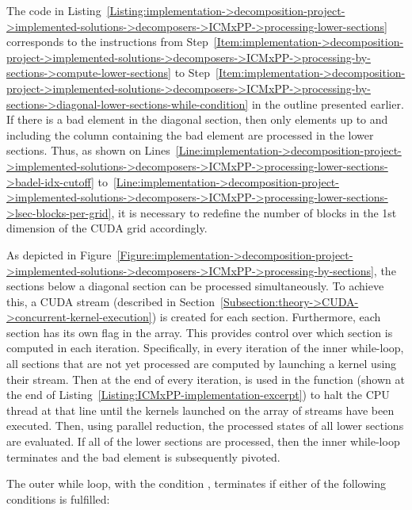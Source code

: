 The code in Listing~\ref{Listing:implementation->decomposition-project->implemented-solutions->decomposers->ICMxPP->processing-lower-sections} corresponds to the instructions from Step~\ref{Item:implementation->decomposition-project->implemented-solutions->decomposers->ICMxPP->processing-by-sections->compute-lower-sections} to Step~\ref{Item:implementation->decomposition-project->implemented-solutions->decomposers->ICMxPP->processing-by-sections->diagonal-lower-sections-while-condition} in the outline presented earlier.\\
If there is a bad element in the diagonal section, then only elements up to and including the column containing the bad element are processed in the lower sections.
Thus, as shown on Lines~\ref{Line:implementation->decomposition-project->implemented-solutions->decomposers->ICMxPP->processing-lower-sections->badel-idx-cutoff} to~\ref{Line:implementation->decomposition-project->implemented-solutions->decomposers->ICMxPP->processing-lower-sections->lsec-blocks-per-grid}, it is necessary to redefine the number of blocks in the 1st dimension of the CUDA grid accordingly.

As depicted in Figure~\ref{Figure:implementation->decomposition-project->implemented-solutions->decomposers->ICMxPP->processing-by-sections}, the sections below a diagonal section can be processed simultaneously.
To achieve this, a CUDA stream (described in Section~\ref{Subsection:theory->CUDA->concurrent-kernel-execution}) is created for each section.
Furthermore, each section has its own  flag in the  array.
This provides control over which section is computed in each iteration.
Specifically, in every iteration of the inner while-loop, all sections that are not yet processed are computed by launching a kernel using their stream.
Then at the end of every iteration,  is used in the  function (shown at the end of Listing~\ref{Listing:ICMxPP-implementation-excerpt}) to halt the CPU thread at that line until the kernels launched on the array of streams have been executed.
Then, using parallel reduction, the processed states of all lower sections are evaluated.
If all of the lower sections are processed, then the inner while-loop terminates and the bad element is subsequently pivoted.

The outer while loop, with the condition , terminates if either of the following conditions is fulfilled:

